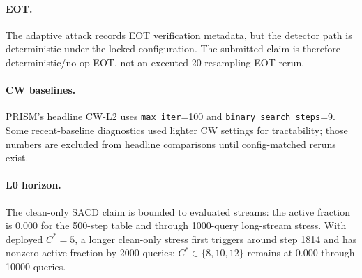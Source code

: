\documentclass{article}
\newcommand{\prism}{\textsc{PRISM}\xspace}
\newcommand{\sacd}{\textsc{SACD}\xspace}
\begin{document}
\paragraph{EOT.}
The adaptive attack records EOT verification metadata, but the detector path is deterministic under the locked configuration. The submitted claim is therefore deterministic/no-op EOT, not an executed 20-resampling EOT rerun.

\paragraph{CW baselines.}
\prism's headline CW-L2 uses \texttt{max\_iter}=100 and \texttt{binary\_search\_steps}=9. Some recent-baseline diagnostics used lighter CW settings for tractability; those numbers are excluded from headline comparisons until config-matched reruns exist.

\paragraph{L0 horizon.}
The clean-only \sacd claim is bounded to evaluated streams: the active fraction is $0.000$ for the 500-step table and through 1000-query long-stream stress. With deployed $C^*=5$, a longer clean-only stress first triggers around step 1814 and has nonzero active fraction by 2000 queries; $C^*\in\{8,10,12\}$ remains at $0.000$ through 10000 queries.

\newpage

\end{document}
